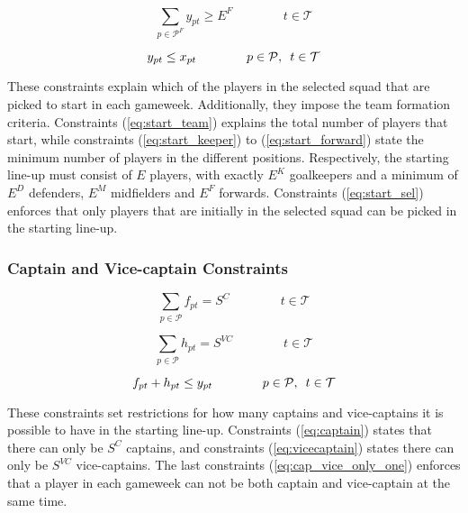 \begin{equation}\label{eq:start_forward}
    \sum_{p \in \mathcal{P}^{F}} y_{pt}\geq E^{F} \qquad\qquad t \in \mathcal{T}
\end{equation}

\begin{equation}\label{eq:start_sel}
    y_{pt} \leq x_{pt} \qquad\qquad  p \in \mathcal{P}, \enskip t \in \mathcal{T}
\end{equation}

These constraints explain which of the players in the selected squad that are picked to start in each gameweek. Additionally, they impose the team formation criteria. Constraints (\ref{eq:start_team}) explains the total number of players that start, while constraints (\ref{eq:start_keeper}) to (\ref{eq:start_forward}) state the minimum number of players in the different positions. Respectively, the starting line-up must consist of $E$ players, with exactly $E^{K}$ goalkeepers and a minimum of $E^{D}$ defenders, $E^{M}$ midfielders and $E^{F}$ forwards. Constraints (\ref{eq:start_sel}) enforces that only players that are initially in the selected squad can be picked in the starting line-up.

\subsubsection{Captain and Vice-captain Constraints}

\begin{equation} \label{eq:captain}
    \sum_{p \in \mathcal{P}} f_{pt} = S^{C} \qquad\qquad t \in \mathcal{T}
\end{equation}

\begin{equation} \label{eq:vicecaptain}
    \sum_{p \in \mathcal{P}} h_{pt} = S^{VC} \qquad\qquad t \in \mathcal{T}
\end{equation}

\begin{equation} \label{eq:cap_vice_only_one}
   f_{pt}+h_{pt} \leq y_{pt}  \qquad\qquad p \in \mathcal{P}, \enskip t \in \mathcal{T}
\end{equation}

These constraints set restrictions for how many captains and vice-captains it is possible to have in the starting line-up. Constraints (\ref{eq:captain}) states that there can only be $S^{C}$ captains, and constraints (\ref{eq:vicecaptain}) states there can only be $S^{VC}$ vice-captains. The last constraints (\ref{eq:cap_vice_only_one}) enforces that a player in each gameweek can not be both captain and vice-captain at the same time. 

